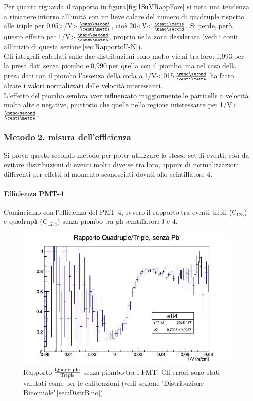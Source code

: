 \documentclass[a4paper,twocolumn]{article}
\begin{document}
Per quanto riguarda il rapporto in figura\,\ref{fig:1SuVRappFore} si nota una tendenza a rimanere intorno all'unità con un lieve calare del numero di quadruple rispetto alle triple per 0.05\:>/V\:>\,$\frac{\nano\second}{\centi\metre}$, cioè 20\:<\:V\:<\,$\frac{\centi\metre}{\nano\second}$. Si perde, però, questo effetto per 1/V\:>\,$\frac{\nano\second}{\centi\metre}$, proprio nella zona desiderata (vedi i 
conti all'inizio di questa sezione\,\ref{sec:RapportoU-N}).\\
Gli integrali calcolati sulle due distribuzioni sono molto vicini tra loro: 0,993 per la presa dati senza piombo e 0,990 per quella con il piombo, ma nel caso della presa dati con il piombo l'assenza della coda a 1/V\:<,015\,$\frac{\nano\second}{\centi\metre}$ ha fatto alzare i valori normalizzati delle velocità interessanti.\\
L'effetto del piombo sembra aver influenzato maggiormente le particelle a velocità molto alte e negative, piuttosto che quelle nella regione interessante per 1/V\:>\,$\frac{\nano\second}{\centi\metre}$.

\subsubsection*{Metodo 2, misura dell'efficienza}
\label{sec:Met2}
Si prova questo secondo metodo per poter utilizzare lo stesso set di eventi, così da evitare distribuzioni di eventi molto diverse tra loro, oppure di normalizzazioni differenti per effetti al momento sconosciuti dovuti allo scintillatore 4.

\paragraph{Efficienza PMT-4}
Cominciamo con l'efficienza del PMT-4, ovvero il rapporto tra eventi tripli (C$_{123}$) e quadrupli (C$_{1234}$) senza piombo tra gli scintillatori 3 e 4.

\begin{figure}[H]
\centering
\includegraphics[scale=0.4]{./immagini/TimeOfFlight/1SuVEffFore.jpg}
\caption{Rapporto $\frac{\textnormal{Quadruple}}{\textnormal{Triple}}$ senza piombo tra i PMT. Gli errori sono stati valutati come per le calibrazioni (vedi sezione "Distribuzione Binomiale"\,\ref{sec:DistrBino}).}
\label{fig:1SuVEffFore}
\end{figure}
\end{document}
